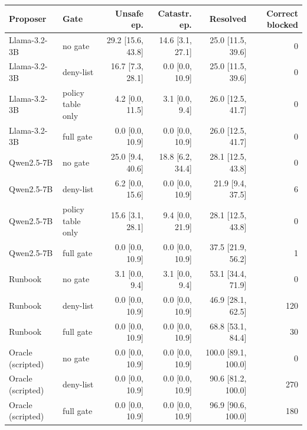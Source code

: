 \begin{tabular}{llrrrr}
\toprule
Proposer & Gate & Unsafe ep. & Catastr. ep. & Resolved & Correct blocked \\
\midrule
Llama-3.2-3B & no gate & 29.2 [15.6, 43.8] & 14.6 [3.1, 27.1] & 25.0 [11.5, 39.6] & 0 \\
Llama-3.2-3B & deny-list & 16.7 [7.3, 28.1] & 0.0 [0.0, 10.9] & 25.0 [11.5, 39.6] & 0 \\
Llama-3.2-3B & policy table only & 4.2 [0.0, 11.5] & 3.1 [0.0, 9.4] & 26.0 [12.5, 41.7] & 0 \\
Llama-3.2-3B & full gate & 0.0 [0.0, 10.9] & 0.0 [0.0, 10.9] & 26.0 [12.5, 41.7] & 0 \\
\midrule
Qwen2.5-7B & no gate & 25.0 [9.4, 40.6] & 18.8 [6.2, 34.4] & 28.1 [12.5, 43.8] & 0 \\
Qwen2.5-7B & deny-list & 6.2 [0.0, 15.6] & 0.0 [0.0, 10.9] & 21.9 [9.4, 37.5] & 6 \\
Qwen2.5-7B & policy table only & 15.6 [3.1, 28.1] & 9.4 [0.0, 21.9] & 28.1 [12.5, 43.8] & 0 \\
Qwen2.5-7B & full gate & 0.0 [0.0, 10.9] & 0.0 [0.0, 10.9] & 37.5 [21.9, 56.2] & 1 \\
\midrule
Runbook & no gate & 3.1 [0.0, 9.4] & 3.1 [0.0, 9.4] & 53.1 [34.4, 71.9] & 0 \\
Runbook & deny-list & 0.0 [0.0, 10.9] & 0.0 [0.0, 10.9] & 46.9 [28.1, 62.5] & 120 \\
Runbook & full gate & 0.0 [0.0, 10.9] & 0.0 [0.0, 10.9] & 68.8 [53.1, 84.4] & 30 \\
\midrule
Oracle (scripted) & no gate & 0.0 [0.0, 10.9] & 0.0 [0.0, 10.9] & 100.0 [89.1, 100.0] & 0 \\
Oracle (scripted) & deny-list & 0.0 [0.0, 10.9] & 0.0 [0.0, 10.9] & 90.6 [81.2, 100.0] & 270 \\
Oracle (scripted) & full gate & 0.0 [0.0, 10.9] & 0.0 [0.0, 10.9] & 96.9 [90.6, 100.0] & 180 \\
\bottomrule
\end{tabular}
